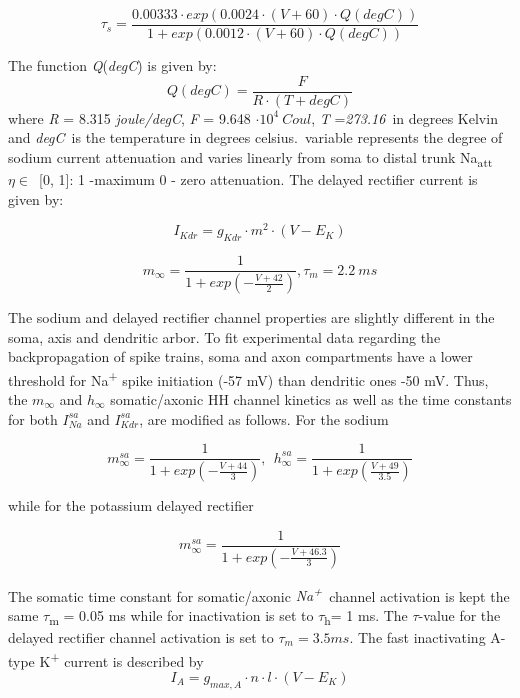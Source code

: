 \documentclass[12pt]{article}
\begin{document}
\begin{equation}
\tau_s=\frac{0.00333\cdot  exp(0.0024 \cdot (V+60)\cdot
		Q(degC))}{1+exp(0.0012 \cdot (V+60)\cdot Q(degC))}
\end{equation}

The function \textit{Q}(\textit{degC}) is given by:
\begin{equation}
Q(degC)= \frac{F}{ R \cdot (T+degC) }
\end{equation}
where \textit{R }=\textit{ }8.315\textit{ joule/degC}, \textit{F }=\textit{ }9.648 $\cdot 10^4 \ Coul$,
\textit{T }=\textit{273.16}~in degrees Kelvin and \textit{degC}~is the temperature in degrees celsius.~variable represents the degree of sodium current
attenuation and varies linearly from soma to distal trunk
Na\textsubscript{att} $\eta \in$~[0, 1]: 1 -maximum 0 - zero attenuation. The delayed rectifier current is given by:

\begin{equation}
I_{Kdr} = g_{Kdr} \cdot m^2 \cdot (V-E_K)
\end{equation}

\begin{equation}
m_{\infty}=\frac{1}{1+exp(-\frac{V+42}{2})}, \tau_m = 2.2 \ ms
\end{equation}

The sodium and delayed rectifier channel properties are slightly different in the soma, axis and dendritic arbor. To fit
experimental data regarding the backpropagation of spike trains, soma and axon compartments have a lower threshold for
Na\textsuperscript{+} spike initiation (-57 mV) than dendritic ones -50 mV. Thus, the $m_{\infty}$ and $h_{\infty}$
somatic/axonic HH channel kinetics as well as the time constants for both $I_{Na}^{sa}$ and $I_{Kdr}^{sa}$, are modified as follows. For the sodium

\begin{equation}
m_{\infty}^{sa}=\frac {1}{1+exp(-\frac{V+44}{3})} ,\ \ 
h_{\infty}^{sa}=\frac {1}{1+exp(\frac{V+49}{3.5})}
\end{equation}

while for the potassium delayed rectifier

\begin{equation}
m_{\infty}^{sa}=\frac {1}{1+exp(-\frac{V+46.3}{3})}
\end{equation}

The somatic time constant for somatic/axonic \textit{Na}\textit{\textsuperscript{+}}~channel activation is kept the
same $\tau$\textsubscript{m} = 0.05 ms while for inactivation is set to $\tau$\textsubscript{h}= 1 ms. The $\tau$-value for the delayed rectifier channel activation is set to $\tau_{m}= 3.5 ms$.
The fast inactivating A-type K\textsuperscript{+ }current is described by
\begin{equation}
I_A = g_{max, A} \cdot n \cdot l \cdot (V - E_K)
\end{equation}
\end{document}

